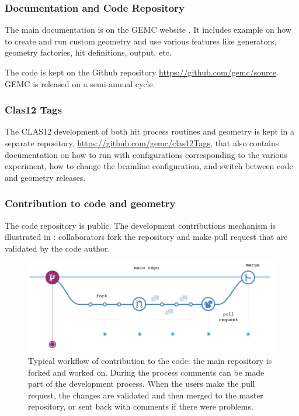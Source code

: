 \subsubsection{Documentation and Code Repository}

The main documentation is on the GEMC website \cite{gemc}. It includes example on how to create and run custom geometry
and use various features like generators, geometry factories, hit definitions, output, etc.

The code is kept on the Github repository \url{https://github.com/gemc/source}. GEMC is released on a semi-annual cycle.

\subsubsection{Clas12 Tags}
The CLAS12 development of both hit process routines and geometry is kept in a separate repository, \url{https://github.com/gemc/clas12Tags},
that also contains documentation on how to run with configurations corresponding to the various experiment, how to change the
beamline configuration, and switch between code and geometry releases.


\subsubsection{Contribution to code and geometry}

The code repository is public. The development contributions mechanism is illustrated in : collaborators fork the repository
and make pull request that are validated by the code author.

\begin{figure}
	\centering
	\includegraphics[width=0.99\columnwidth,keepaspectratio]{img/github.png}
	\caption{Typical workflow of contribution to the code: the main repository is forked and worked on. During the process comments
             can be made part of the development process. When the users make the pull request, the changes are validated and then merged
             to the master repository, or sent back with comments if there were problems.}
	\label{fig:github}
\end{figure}




